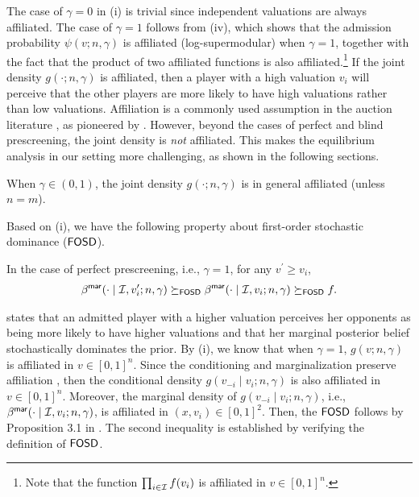 The case of $\gamma=0$ in (i) is trivial since independent valuations are always affiliated.
The case of $\gamma=1$ follows from  (iv), which shows that the admission probability $\psi(v;n,\gamma)$ is affiliated (log-supermodular) when $\gamma=1$, together with the fact that the product of two affiliated functions is also affiliated.\footnote{Note that the function $\prod_{i\in \mathcal{I}}f(v_i)$ is affiliated in $v\in [0,1]^n$.}
If the joint density $g(\cdot;n,\gamma)$ is affiliated, then a player with a high valuation $v_i$ will perceive that the other players are more likely to have high valuations rather than low valuations. Affiliation is a commonly used assumption in the auction literature \citep{krishna_1997_all_pay_affiliation,fang2002_GEB_affilited_secondprice,kotowski_2014_affiliated_allpay_budget}, as pioneered by \citet{milgrom_1982_auctiontheory_competitive_bidding}. 
However, beyond the cases of perfect and blind prescreening, the joint density is \textit{not} affiliated.
This makes the equilibrium analysis in our setting more challenging, as shown in the following sections.
\begin{remark}[Unaffiliation]
  When $\gamma\in (0,1)$, the joint density $g(\cdot;n,\gamma)$ is in general {} affiliated (unless $n=m$).  
\end{remark}





Based on  (i), we have the following property about first-order stochastic dominance ($\mathsf{FOSD}$).

\begin{proposition}
\label{prop:stochastic_domiance_gamma_1}
In the case of perfect prescreening, i.e., $\gamma=1$, for any $v^\prime \geq v_i$, 
\begin{align*}
\beta^{\mathsf{mar}}(\cdot \mid \mathcal{I},v_i^\prime;n,\gamma) \succeq_{\mathsf{FOSD}} \beta^{\mathsf{mar}}(\cdot \mid \mathcal{I},v_i;n,\gamma) \succeq_{\mathsf{FOSD}} f.
\end{align*}
\end{proposition}

 states that an admitted player with a higher valuation perceives her opponents as being more likely to have higher valuations and that her marginal posterior belief stochastically dominates the prior.
By  (i), we know that when $\gamma=1$, $g(v;n,\gamma)$ is affiliated in $v\in [0,1]^n$.
Since the conditioning and marginalization preserve affiliation \citep{karlin_1980_MTP2}, then the conditional density $g(v_{-i}\mid v_i;n,\gamma)$ is also affiliated in $v\in [0,1]^n$. Moreover, the marginal density of $g(v_{-i}\mid v_i;n,\gamma)$, i.e.,  $\beta^{\mathsf{mar}}(\cdot \mid \mathcal{I},v_i;n,\gamma)$, is affiliated in $(x,v_i)\in [0,1]^2$. Then, the $\mathsf{FOSD}$ follows by Proposition 3.1 in \citet{castro_2007_affiliation_positive_dependence}. The second inequality is established by verifying the definition of $\mathsf{FOSD}$.

